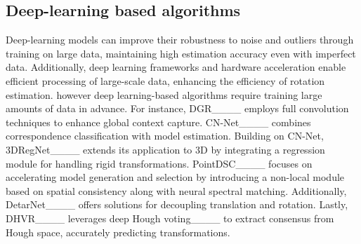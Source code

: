 \subsection{Deep-learning based algorithms}
Deep-learning models can improve their robustness to noise and outliers through training on large data, maintaining high estimation accuracy even with imperfect data. Additionally, deep learning frameworks and hardware acceleration enable efficient processing of large-scale data, enhancing the efficiency of rotation estimation. however deep learning-based algorithms require training large amounts of data in advance. For instance, DGR____ employs full convolution techniques to enhance global context capture. CN-Net____ combines correspondence classification with model estimation. Building on CN-Net, 3DRegNet____ extends its application to 3D by integrating a regression module for handling rigid transformations. PointDSC____ focuses on accelerating model generation and selection by introducing a non-local module based on spatial consistency along with neural spectral matching. Additionally, DetarNet____ offers solutions for decoupling translation and rotation. Lastly, DHVR____ leverages deep Hough voting____ to extract consensus from Hough space, accurately predicting transformations.
